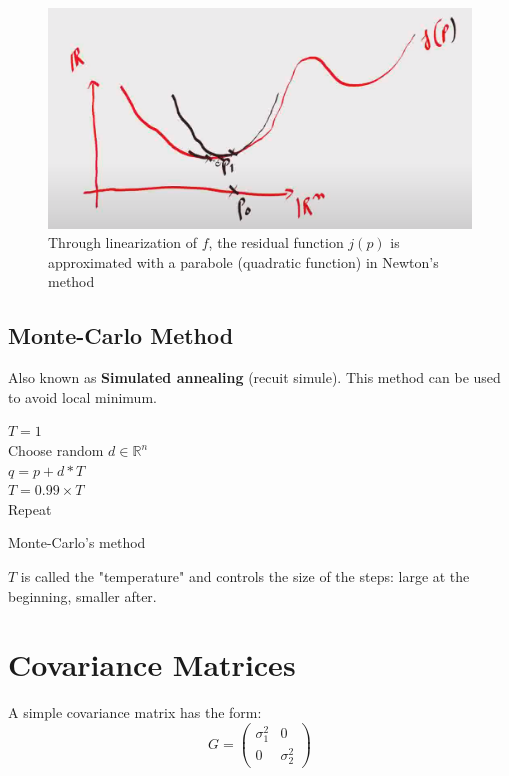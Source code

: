 \begin{figure}[H]
    \centering
    \includegraphics[width=\linewidth]{content/newton_algorithm.png}
    \caption{Through linearization of $f$, the residual function $j(p)$ is approximated with a parabole (quadratic function) in Newton's method}
    \label{fig:params_estimation_linear_model_2}
\end{figure}

\subsection{Monte-Carlo Method}

Also known as \textbf{Simulated annealing} (recuit simule). This method can be used to avoid local minimum.


\begin{algorithm}[H]
\DontPrintSemicolon
{}
\KwOutput{}
$T = 1$ \\
Choose random $d \in \mathbb{R}^n $\\
$q = p + d * T$ \\
$T = 0.99 \times T$ \\
Repeat
\caption{Monte-Carlo's method}
\end{algorithm}

$T$ is called the "temperature" and controls the size of the steps: large at the beginning, smaller after.



\section{Covariance Matrices}

A simple covariance matrix has the form:
\begin{equation}
    G = \left(\begin{array}{cc}
        \sigma_1^2 & 0 \\
        0 & \sigma_2^2
    \end{array}\right)
\end{equation}

